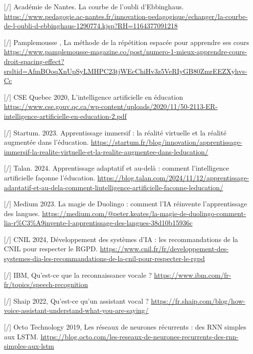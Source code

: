 \documentclass[11pt,a4paper]{report}
\begin{document}
\begin{thebibliography}{9}
        [/] Académie de Nantes. La courbe de l'oubli d'Ebbinghaus. \break
        \url{https://www.pedagogie.ac-nantes.fr/innovation-pedagogique/echanger/la-courbe-de-l-oubli-d-ebbinghaus-1290774.kjsp?RH=1164377091218}
    
        [/] Pamplemousse , La méthode de la répétition espacée pour apprendre ses cours \break
        \url{https://www.pamplemousse-magazine.co/post/numero-1-mieux-apprendre-cours-droit-spacing-effect?srsltid=AfmBOoqXnUpSyLMHPC23tjWEcChiHv3z5VeRIyGB80ZmrEEZXyhvs-Cc}
    
        [/] CSE Quebec 2020, L’intelligence artificielle en éducation
        \url{https://www.cse.gouv.qc.ca/wp-content/uploads/2020/11/50-2113-ER-intelligence-artificielle-en-education-2.pdf}
    
        [/] Startum. 2023. Apprentissage immersif : la réalité virtuelle et la réalité augmentée dans l'éducation. \break
        \url{https://startum.fr/blog/innovation/apprentissage-immersif-la-realite-virtuelle-et-la-realite-augmentee-dans-leducation/}
    
        [/] Talan. 2024. Apprentissage adaptatif et au-delà : comment l'intelligence artificielle façonne l'éducation. \break
        \url{https://blog.talan.com/2024/11/12/apprentissage-adaptatif-et-au-dela-comment-lintelligence-artificielle-faconne-leducation/}
    
        [/] Medium 2023. La magie de Duolingo : comment l'IA réinvente l'apprentissage des langues. \break
        \url{https://medium.com/@peter.keates/la-magie-de-duolingo-comment-lia-r%C3%A9invente-l-apprentissage-des-langues-38d10b15936c}

        [/] CNIL 2024, Développement des systèmes d’IA : les recommandations de la CNIL pour respecter le RGPD. \break
        \url{https://www.cnil.fr/fr/developpement-des-systemes-dia-les-recommandations-de-la-cnil-pour-respecter-le-rgpd}
    
        [/] IBM, Qu’est-ce que la reconnaissance vocale ? \break
        \url{https://www.ibm.com/fr-fr/topics/speech-recognition}
    
        [/] Shaip 2022, Qu'est-ce qu'un assistant vocal ? \break
        \url{https://fr.shaip.com/blog/how-voice-assistant-understand-what-you-are-saying/}
    
        [/] Octo Technology 2019, Les réseaux de neurones récurrents : des RNN simples aux LSTM. \break
        \url{https://blog.octo.com/les-reseaux-de-neurones-recurrents-des-rnn-simples-aux-lstm}
    

\end{thebibliography}
\end{document}
